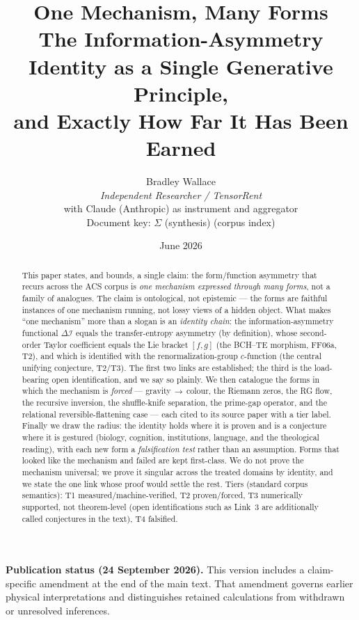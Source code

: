 \documentclass[11pt,a4paper]{article}
\title{\textbf{One Mechanism, Many Forms}\\[0.45em]
\large The Information-Asymmetry Identity as a Single Generative Principle,\\
and Exactly How Far It Has Been Earned}
\author{Bradley Wallace\\
\small \textit{Independent Researcher / TensorRent}\\
\small with Claude (Anthropic) as instrument and aggregator\\
\small Document key: \textsf{$\Sigma$ (synthesis)} (corpus index)}
\date{June 2026}
\newcommand{\dI}{\Delta\mathcal{I}}
\newcommand{\TT}{\textsf{T1}}
\newcommand{\Tw}{\textsf{T2}}
\newcommand{\Th}{\textsf{T3}}
\newcommand{\Tf}{\textsf{T4}}
\newcommand{\paper}[1]{\textsf{#1}}
\theoremstyle{definition}
\theoremstyle{plain}
\begin{document}
\maketitle

\begin{abstract}
\noindent This paper states, and bounds, a single claim: the form/function asymmetry that recurs
across the ACS corpus is \emph{one mechanism expressed through many forms}, not a family of
analogues. The claim is ontological, not epistemic --- the forms are faithful instances of one
mechanism running, not lossy views of a hidden object. What makes ``one mechanism'' more than a
slogan is an \emph{identity chain}: the information-asymmetry functional $\dI$ equals the
transfer-entropy asymmetry (by definition), whose second-order Taylor coefficient equals the Lie
bracket $[f,g]$ (the BCH--TE morphism, \paper{FF06a}, \Tw), and which is identified with the
renormalization-group $c$-function (the central unifying conjecture, \Tw/\Th). The first two links
are established; the third is the load-bearing open identification, and we say so plainly. We then
catalogue the forms in which the mechanism is \emph{forced} --- gravity\,$\to$\,colour, the Riemann
zeros, the RG flow, the recursive inversion, the shuffle-knife separation, the prime-gap operator,
and the relational reversible-flattening case --- each cited to its source paper with a tier label.
Finally we draw the radius: the identity holds where it is proven and is a conjecture where it is
gestured (biology, cognition, institutions, language, and the theological reading), with each new
form a \emph{falsification test} rather than an assumption. Forms that looked like the mechanism and
failed are kept first-class. We do not prove the mechanism universal; we prove it singular across the
treated domains by identity, and we state the one link whose proof would settle the rest. Tiers (standard corpus semantics):
\TT{} measured/machine-verified, \Tw{} proven/forced, \Th{} numerically
supported, not theorem-level (open identifications such as Link~3 are
additionally called conjectures in the text), \Tf{} falsified.
\end{abstract}
\par\smallskip\noindent\textbf{Publication status (24 September 2026).}
This version includes a claim-specific amendment at the end of the main text.
That amendment governs earlier physical interpretations and distinguishes
retained calculations from withdrawn or unresolved inferences.\par\smallskip
\end{document}

